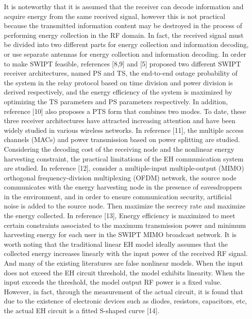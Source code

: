 \documentclass[conference]{IEEEtran}
\begin{document}
It is noteworthy that it is assumed that the receiver can decode information and acquire energy from the same received signal, however this is not practical because the transmitted information content may be destroyed in the process of performing energy collection in the RF domain. In fact, the received signal must be divided into two different parts for energy collection and information decoding, or use separate antennas for energy collection and information decoding.
In order to make SWIPT feasible, references [8,9] and [5] proposed two different SWIPT receiver architectures, named PS and TS, the end-to-end outage probability of the system in the relay protocol based on time division and power division is derived respectively, and the energy efficiency of the system is maximized by optimizing the TS parameters and PS parameters respectively. 
In addition, reference [10] also proposes a PTS form that combines two modes. To date, these three receiver architectures have attracted increasing attention and have been widely studied in various wireless networks.
In reference [11], the multiple access channels (MACs) and power transmission based on power splitting are studied. Considering the decoding cost of the receiving node and the nonlinear energy harvesting constraint, the practical limitations of the EH communication system are studied.
In reference [12], consider a multiple-input multiple-output (MIMO) orthogonal frequency-division multiplexing (OFDM) network, the source node communicates with the energy harvesting node in the presence of eavesdroppers in the environment, and in order to ensure communication security, artificial noise is added to the source node. Then maximize the secrecy rate and maximize the energy collected. 
In reference [13], Energy efficiency is maximized to meet certain constraints associated to the maximum transmission power and minimum harvesting energy for each user in the SWIPT MIMO broadcast network. 
It is worth noting that the traditional linear EH model ideally assumes that the collected energy increases linearly with the input power of the received RF signal. And many of the existing literatures are false nonlinear models. When the input does not exceed the EH circuit threshold, the model exhibits linearity. When the input exceeds the threshold, the model output RF power is a fixed value. 
However, in fact, through the measurement of the actual circuit, it is found that due to the existence of electronic devices such as diodes, resistors, capacitors, etc, the actual EH circuit is a fitted S-shaped curve [14].
\end{document}
